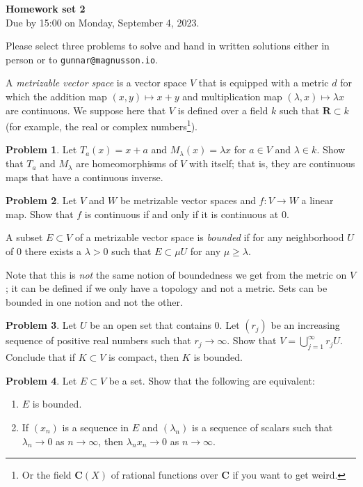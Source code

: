 \documentclass[11pt]{article}
\theoremstyle{definition}
\newtheorem{prob}{Problem}
\newcommand{\kk}[1]{\mathbf{#1}}
\def\head{
\begin{center}
\textbf{\LARGE Homework set 2}
\\[3pt]
Due by 15:00 on Monday, September 4, 2023.
\end{center}
\medskip
}
\begin{document}
\head

Please select three problems to solve and hand in written solutions either in person or to \verb+gunnar@magnusson.io+.

A \emph{metrizable vector space} is a vector space $V$ that is
equipped with a metric $d$ for which the addition map $(x, y) \mapsto x +
y$ and multiplication map $(\lambda, x) \mapsto \lambda x$ are continuous.
We suppose here that $V$ is defined over a field $k$ such that $\kk R \subset k$
(for example, the real or complex numbers\footnote{Or the field $\kk C(X)$ of rational functions over $\kk C$ if you want to get weird.}).


\begin{prob}
Let $T_a(x) = x + a$ and $M_\lambda(x) = \lambda x$ for $a \in V$ and $\lambda
\in k$.
Show that $T_a$ and $M_\lambda$ are homeomorphisms of $V$ with itself; that is,
they are continuous maps that have a continuous inverse.
\end{prob}


\begin{prob}
Let $V$ and $W$ be metrizable vector spaces and $f : V \to W$ a linear map.
Show that $f$ is continuous if and only if it is continuous at $0$.
\end{prob}


A subset $E \subset V$ of a metrizable vector space is \emph{bounded} if for
any neighborhood $U$ of $0$ there exists a $\lambda > 0$ such that $E
\subset \mu U$ for any $\mu \geq \lambda$.

Note that this is \emph{not} the same notion of boundedness we get from the
metric on $V$; it can be defined if we only have a topology and not a metric.
Sets can be bounded in one notion and not the other.


\begin{prob}
Let $U$ be an open set that contains $0$.
Let $(r_j)$ be an increasing sequence of positive real numbers such that $r_j
\to \infty$. Show that $V = \bigcup_{j=1}^\infty r_j U$.
Conclude that if $K \subset V$ is compact, then $K$ is bounded.
\end{prob}

\begin{prob}
Let $E \subset V$ be a set.
Show that the following are equivalent:
\begin{enumerate}
\item
$E$ is bounded.

\item
If $(x_n)$ is a sequence in $E$ and $(\lambda_n)$ is a sequence of scalars such
that $\lambda_n \to 0$ as $n \to \infty$, then $\lambda_n x_n \to 0$ as $n \to
\infty$.
\end{enumerate}
\end{prob}
\end{document}
